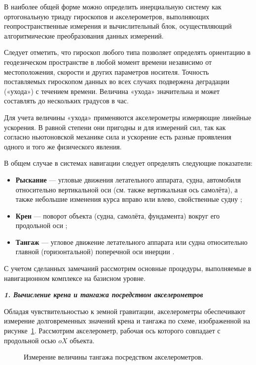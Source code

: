 В наиболее общей форме можно определить инерциальную систему как ортогональную триаду гироскопов и акселерометров, выполняющих геопространственные измерения и вычислительный блок, осуществляющий алгоритмические преобразования данных измерений.

Следует отметить, что гироскоп любого типа позволяет определять ориентацию в геодезическом пространстве в любой момент времени независимо от местоположения, скорости и других параметров носителя. Точность поставляемых гироскопом данных во всех случаях подвержена деградации («ухода») с течением времени. Величина «ухода» значительна и может составлять до нескольких градусов в час\cite{laserLocation}.

Для учета величины «ухода» применяются акселерометры измеряющие линейные ускорения. В равной степени они пригодны и для измерений сил, так как согласно ньютоновской механике сила и ускорение есть разные проявления одного и того же физического явления.

В общем случае в системах навигации следует определять следующие показатели:
\begin{itemize}
\item \textbf{Рыскание} — угловые движения летательного аппарата, судна, автомобиля относительно вертикальной оси (см. также вертикальная ось самолёта), а также небольшие изменения курса вправо или влево, свойственные судну \cite{Avia};
\item \textbf{Крен} — поворот объекта (судна, самолёта, фундамента) вокруг его продольной оси \cite{Avia};
\item \textbf{Тангаж} — угловое движение летательного аппарата или судна относительно главной (горизонтальной) поперечной оси инерции \cite{Avia}.

\end{itemize}
С учетом сделанных замечаний рассмотрим основные процедуры, выполняемые в навигационном комплексе на базисном уровне.

\textit{\textbf{1. Вычисление крена и тангажа посредством акселерометров}}

Обладая чувствительностью к земной гравитации, акселерометры обеспечивают измерение долговременных значений крена и тангажа по схеме, изображенной на рисунке~\ref{pic:tangazh}. Рассмотрим акселерометр, рабочая ось которого совпадает с продольной осью $oX$ объекта.

\begin{figure}[!htb]
\caption{Измерение величины тангажа посредством акселерометров.}
\label{pic:tangazh}
\end{figure}

